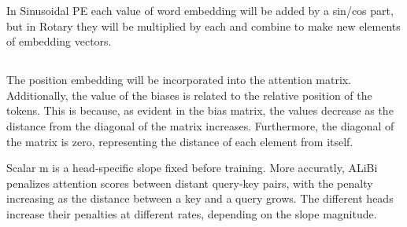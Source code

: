\documentclass{article}
\begin{document}
In Sinusoidal PE each value of word embedding will be added by a sin/cos 
part, but  in Rotary they will be multiplied by each and
combine to make new elements of embedding vectors.


\subsection{}
The position embedding will be incorporated into the attention matrix.
Additionally, the value of the biases is related to the relative position
of the tokens. This is because, as evident in the bias matrix, the 
values decrease as the distance from the diagonal of the matrix 
increases. Furthermore, the diagonal of the matrix is zero, 
representing the distance of each element from itself.

Scalar m is a head-specific slope fixed before training.
More accuratly, ALiBi penalizes attention scores between distant query-key
pairs, with the penalty increasing as the distance between a key and a query grows. The different
heads increase their penalties at different rates, depending on the slope magnitude.


\section{}
\end{document}
